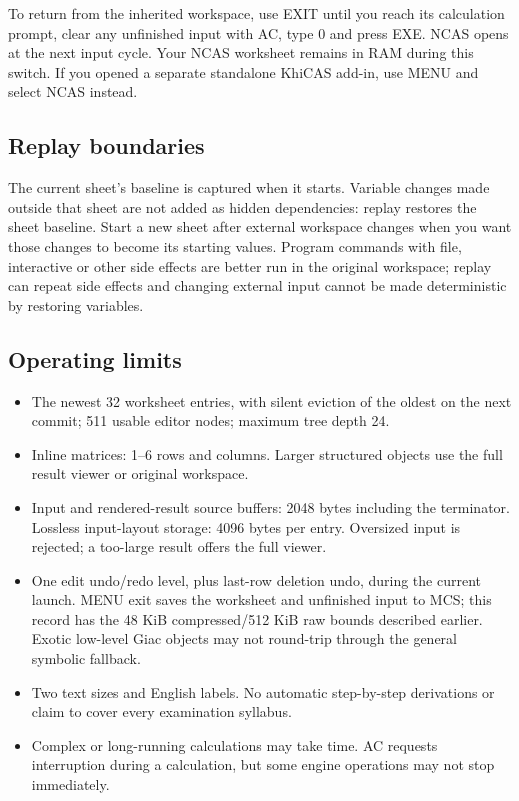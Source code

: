 \documentclass[11pt,a4paper]{article}
\begin{document}
To return from the inherited workspace, use EXIT until you reach its calculation prompt, clear any unfinished input with AC, type 0 and press EXE. NCAS opens at the next input cycle. Your NCAS worksheet remains in RAM during this switch. If you opened a separate standalone KhiCAS add-in, use MENU and select NCAS instead.

\subsection{Replay boundaries}
The current sheet's baseline is captured when it starts. Variable changes made outside that sheet are not added as hidden dependencies: replay restores the sheet baseline. Start a new sheet after external workspace changes when you want those changes to become its starting values. Program commands with file, interactive or other side effects are better run in the original workspace; replay can repeat side effects and changing external input cannot be made deterministic by restoring variables.

\subsection{Operating limits}
\begin{itemize}
\item The newest 32 worksheet entries, with silent eviction of the oldest on the next commit; 511 usable editor nodes; maximum tree depth 24.
\item Inline matrices: 1--6 rows and columns. Larger structured objects use the full result viewer or original workspace.
\item Input and rendered-result source buffers: 2048 bytes including the terminator. Lossless input-layout storage: 4096 bytes per entry. Oversized input is rejected; a too-large result offers the full viewer.
\item One edit undo/redo level, plus last-row deletion undo, during the current launch. MENU exit saves the worksheet and unfinished input to MCS; this record has the 48 KiB compressed/512 KiB raw bounds described earlier. Exotic low-level Giac objects may not round-trip through the general symbolic fallback.
\item Two text sizes and English labels. No automatic step-by-step derivations or claim to cover every examination syllabus.
\item Complex or long-running calculations may take time. AC requests interruption during a calculation, but some engine operations may not stop immediately.
\end{itemize}
\end{document}
